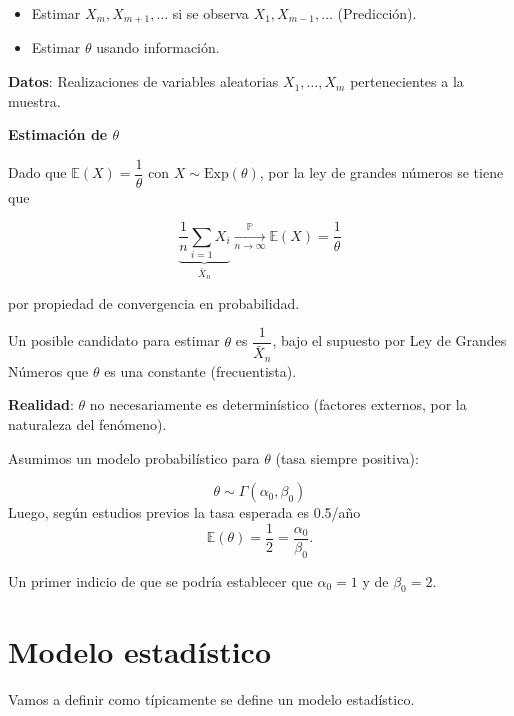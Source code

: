 \documentclass[
  12pt,
]{book}
\begin{document}
\begin{itemize}
\item
  Estimar \(X_m, X_{m+1}, \dots\) si se observa \(X_1, X_{m-1}, \dots\) (Predicción).
\item
  Estimar \(\theta\) usando información.
\end{itemize}

\textbf{Datos}: Realizaciones de variables aleatorias \(X_1,\dots,X_m\) pertenecientes a la muestra.

\textbf{Estimación de \(\theta\)}

Dado que \(\mathbb{E}(X) = \dfrac{1}{\theta}\) con \(X \sim \text{Exp}(\theta)\), por la ley de grandes números se tiene que

\begin{equation*}
\underbrace{\dfrac{1}{n} \sum_{i=1}{X_i}}_{\bar{X}_n} \xrightarrow[n\to \infty]{\mathbb{P}}\mathbb{E}(X) = \dfrac{1}{\theta}
\end{equation*}

por propiedad de convergencia en probabilidad.

Un posible candidato para estimar \(\theta\) es \(\dfrac{1}{\bar X_n}\), bajo el supuesto por Ley de Grandes Números que \(\theta\) es una constante (frecuentista).

\textbf{Realidad}: \(\theta\) no necesariamente es determinístico (factores externos, por la naturaleza del fenómeno).

Asumimos un modelo probabilístico para \(\theta\) (tasa siempre positiva):

\begin{equation*}
\theta \sim \Gamma(\alpha_0,\beta_0)
\end{equation*}
Luego, según estudios previos la tasa esperada es 0.5/año
\begin{equation*}
\mathbb{E}(\theta) = \dfrac{1}{2} = \dfrac{\alpha_0}{\beta_0}.
\end{equation*}

Un primer indicio de que se podría establecer que \(\alpha_0 = 1\) y de \(\beta_0 = 2\).

\hypertarget{modelo-estaduxedstico}{%
\section{Modelo estadístico}\label{modelo-estaduxedstico}}

Vamos a definir como típicamente se define un modelo estadístico.
\end{document}
